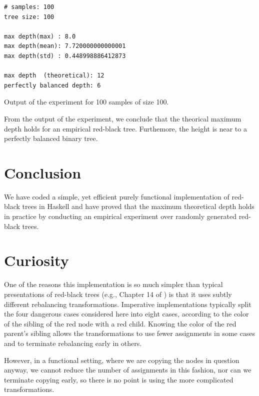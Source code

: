 \documentclass[12pt, a4paper]{article} %
\begin{document}
\begin{listing}[H]
  \begin{verbatim}
# samples: 100
tree size: 100

max depth(max) : 8.0
max depth(mean): 7.720000000000001
max depth(std) : 0.448998886412873

max depth  (theoretical): 12
perfectly balanced depth: 6
  \end{verbatim}
  \caption{Output of the experiment for 100 samples of size 100.}
  \label{lst:output}
\end{listing}

From the output of the experiment, we conclude that the theorical maximum depth holds for an empirical red-black tree. Furthemore, the height is near to a perfectly balanced binary tree.

\section{Conclusion}\label{s:conclusion}

We have coded a simple, yet efficient purely functional implementation of red-black trees in Haskell and have proved that the maximum theoretical depth holds in practice by conducting an empirical experiment over randomly generated red-black trees.

\section{Curiosity}\label{s:curiosity}

One of the reasons this implementation is so much  simpler than typical presentations of red-black trees (e.g., Chapter 14 of \cite{clr90}) is that it uses subtly different  rebalancing  transformations.  Imperative implementations typically split the four dangerous cases considered here into eight cases, according to the color  of the sibling  of the red node with a red child.  Knowing the color of the red parent's  sibling allows the transformations  to use fewer  assignments in some cases and to terminate rebalancing early in others.

However, in a functional setting, where we are copying the nodes in question  anyway, we cannot reduce the number  of assignments in this fashion, nor can we terminate copying early, so there is no point is using the more complicated transformations.

\end{document}
